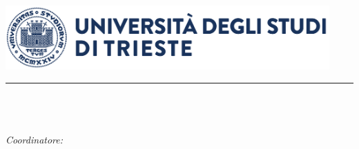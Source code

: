 
\begin{titlepage} 

\newcommand{\HRule}{\rule{\linewidth}{0.5mm}}

\null\vfill %


\begin{center}
\large
\sffamily
	
	\center %
	
	
	\vfill
	\includegraphics[width=0.93\textwidth]{Figure/logoUniTs_ultraesteso.pdf}\\[0.5cm] 
	 
	
	\HRule\\[0.5cm] %
	
	\textsc{\Large \theDepartment}\\[0.5cm] %
	
	\textsc{\large \theDegree}\\ %
	\textit{Coordinatore: \theCoordinator} \\ [0.5cm] 
	

\end{center}
\end{titlepage}
